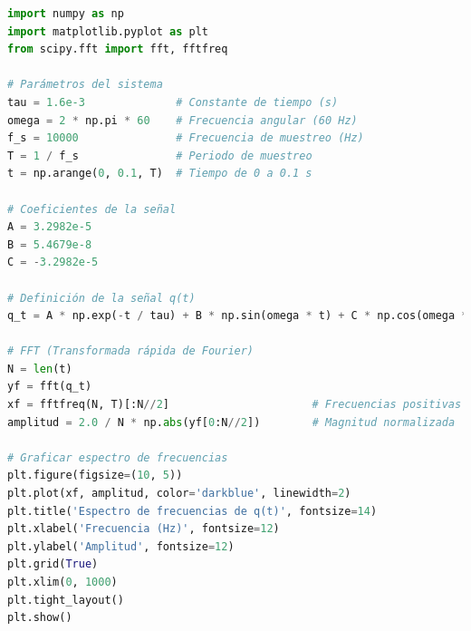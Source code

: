 \begin{lstlisting}[language=Python, caption={Código Python del análisi espectral}, label={cod:python}, frame=single, basicstyle=\footnotesize\ttfamily]
import numpy as np
import matplotlib.pyplot as plt
from scipy.fft import fft, fftfreq

# Parámetros del sistema
tau = 1.6e-3              # Constante de tiempo (s)
omega = 2 * np.pi * 60    # Frecuencia angular (60 Hz)
f_s = 10000               # Frecuencia de muestreo (Hz)
T = 1 / f_s               # Periodo de muestreo
t = np.arange(0, 0.1, T)  # Tiempo de 0 a 0.1 s

# Coeficientes de la señal
A = 3.2982e-5
B = 5.4679e-8
C = -3.2982e-5

# Definición de la señal q(t)
q_t = A * np.exp(-t / tau) + B * np.sin(omega * t) + C * np.cos(omega * t)

# FFT (Transformada rápida de Fourier)
N = len(t)
yf = fft(q_t)
xf = fftfreq(N, T)[:N//2]                      # Frecuencias positivas
amplitud = 2.0 / N * np.abs(yf[0:N//2])        # Magnitud normalizada

# Graficar espectro de frecuencias
plt.figure(figsize=(10, 5))
plt.plot(xf, amplitud, color='darkblue', linewidth=2)
plt.title('Espectro de frecuencias de q(t)', fontsize=14)
plt.xlabel('Frecuencia (Hz)', fontsize=12)
plt.ylabel('Amplitud', fontsize=12)
plt.grid(True)
plt.xlim(0, 1000)
plt.tight_layout()
plt.show()
\end{lstlisting}


